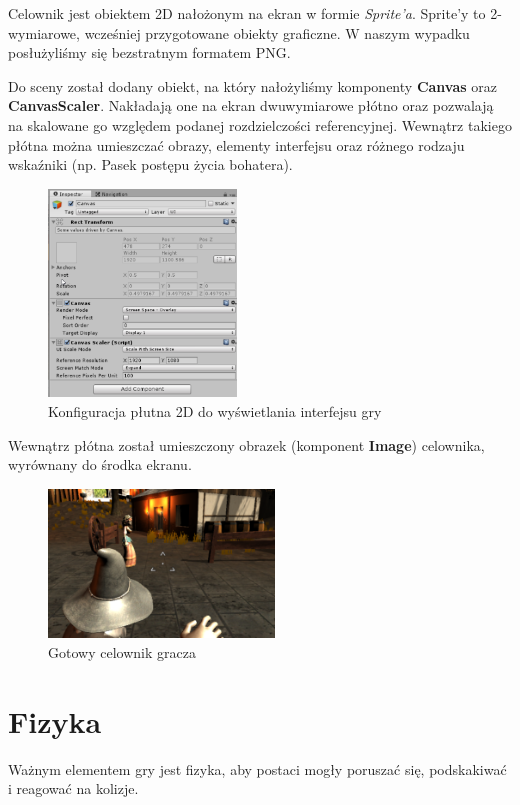 \documentclass[openright]{xmgr}
\newcommand{\name}[1]{\textbf{\textcolor{NavyBlue}{#1}}}
\begin{document}
      Celownik jest obiektem 2D nałożonym na ekran w formie \textit{Sprite'a}. Sprite'y to 2-wymiarowe, wcześniej przygotowane obiekty graficzne. W naszym wypadku posłużyliśmy się bezstratnym formatem PNG.

      Do sceny został dodany obiekt, na który nałożyliśmy komponenty \name{Canvas} oraz \name{CanvasScaler}. Nakładają one na ekran dwuwymiarowe płótno oraz pozwalają na skalowane go względem podanej rozdzielczości referencyjnej. Wewnątrz takiego płótna można umieszczać obrazy, elementy interfejsu oraz różnego rodzaju wskaźniki (np. Pasek postępu życia bohatera).

      \begin{figure}[H]
      \center
      \includegraphics[width=5cm]{celownik_1.png}
      \caption{Konfiguracja płutna 2D do wyświetlania interfejsu gry}
      \end{figure}

      Wewnątrz płótna został umieszczony obrazek (komponent \name{Image}) celownika, wyrównany do środka ekranu.

      \begin{figure}[H]
      \center
      \includegraphics[width=6cm]{celownik_2.png}
      \caption{Gotowy celownik gracza}
      \end{figure}

  \section{Fizyka}\label{sec:fizyka}

      Ważnym elementem gry jest fizyka, aby postaci mogły poruszać się, podskakiwać i reagować na kolizje.
\end{document}
